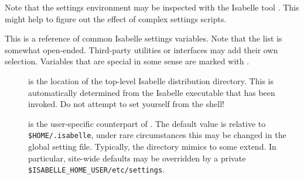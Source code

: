 \begin{isabellebody}
\begin{isamarkuptext}
\begin{itemize}
  \end{itemize}

  \medskip Note that the settings environment may be inspected with
  the Isabelle tool \hyperlink{tool.getenv}{\mbox{}}.  This might help to figure out the
  effect of complex settings scripts.%
\end{isamarkuptext}%
\isamarkuptrue%
%
\isamarkuptrue%
%
\begin{isamarkuptext}%
This is a reference of common Isabelle settings variables. Note that
  the list is somewhat open-ended. Third-party utilities or interfaces
  may add their own selection. Variables that are special in some
  sense are marked with .

  \begin{description}

  \item[\hypertarget{setting.ISABELLE-HOME}{\hyperlink{setting.ISABELLE-HOME}{\mbox{}}}] is the
  location of the top-level Isabelle distribution directory. This is
  automatically determined from the Isabelle executable that has been
  invoked.  Do not attempt to set \hyperlink{setting.ISABELLE-HOME}{\mbox{}} yourself
  from the shell!
  
  \item[\hypertarget{setting.ISABELLE-HOME-USER}{\hyperlink{setting.ISABELLE-HOME-USER}{\mbox{}}}] is the user-specific
  counterpart of \hyperlink{setting.ISABELLE-HOME}{\mbox{}}. The default value is
  relative to \verb|$HOME/.isabelle|, under rare circumstances
  this may be changed in the global setting file.  Typically, the
  \hyperlink{setting.ISABELLE-HOME-USER}{\mbox{}} directory mimics \hyperlink{setting.ISABELLE-HOME}{\mbox{}} to some extend. In particular, site-wide defaults may
  be overridden by a private \verb|$ISABELLE_HOME_USER/etc/settings|.
  

\end{description}
\end{isamarkuptext}
\end{isabellebody}
